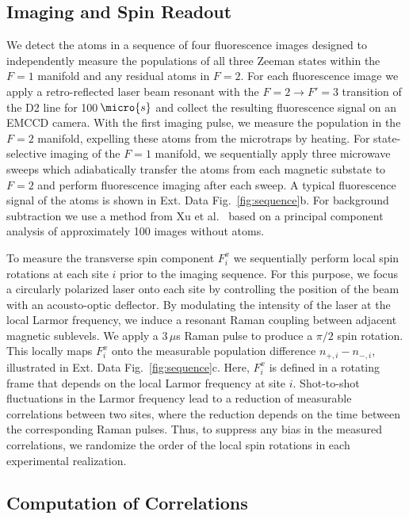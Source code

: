 \documentclass[aps,pra,twocolumn,superscriptaddress]{revtex4-1} %
\begin{document}
\begin{bibunit}
\subsection{Imaging and Spin Readout}
We detect the atoms in a sequence of four fluorescence images designed to independently measure the populations of all three Zeeman states within the $F=1$ manifold and any residual atoms in $F=2$. 
For each fluorescence image we apply a retro-reflected laser beam resonant with the $F=2 \rightarrow F' = 3$ transition of the D2 line for 100\,$\micro{s}$ and collect the resulting fluorescence signal on an EMCCD camera.
With the first imaging pulse, we measure the population in the $F=2$ manifold, expelling these atoms from the microtraps by heating.
For state-selective imaging of the $F = 1$ manifold, we sequentially apply three microwave sweeps which adiabatically transfer the atoms from each magnetic substate to $F=2$ and perform fluorescence imaging after each sweep.
A typical fluorescence signal of the atoms is shown in Ext. Data Fig.~\ref{fig:sequence}b.
For background subtraction we use a method from Xu et al.~\cite{xu2019probing} based on a principal component analysis of approximately 100 images without atoms.

To measure the transverse spin component $F^x_i$ we sequentially perform local spin rotations at each site $i$ prior to the imaging sequence. For this purpose, we focus a circularly polarized laser onto each site by controlling the position of the beam with an acousto-optic deflector. By modulating the intensity of the laser at the local Larmor frequency, we induce a resonant Raman coupling between adjacent magnetic sublevels. We apply a $3\,\mu$s Raman pulse to produce a $\pi/2$ spin rotation. This locally maps $F^x_i$ onto the measurable population difference $n_{+,i} - n_{-,i}$, illustrated in Ext. Data Fig.~\ref{fig:sequence}c. Here, $F^x_i$ is defined in a rotating frame that depends on the local Larmor frequency at site $i$.
Shot-to-shot fluctuations in the Larmor frequency lead to a reduction of measurable correlations between two sites, where the reduction depends on the time between the corresponding Raman pulses. Thus, to suppress any bias in the measured correlations, we randomize the order of the local spin rotations in each experimental realization.

\subsection{Computation of Correlations}


\end{bibunit}
\end{document}
